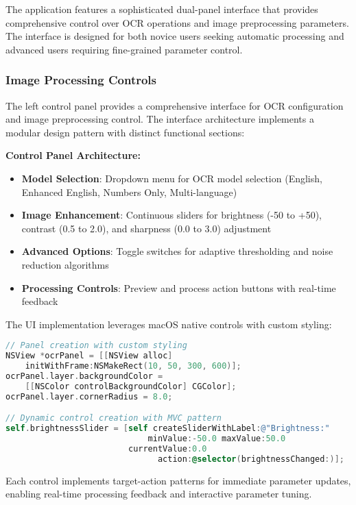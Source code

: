 The application features a sophisticated dual-panel interface that provides comprehensive control over OCR operations and image preprocessing parameters. The interface is designed for both novice users seeking automatic processing and advanced users requiring fine-grained parameter control.

\subsubsection{Image Processing Controls}

The left control panel provides a comprehensive interface for OCR configuration and image preprocessing control. The interface architecture implements a modular design pattern with distinct functional sections:

\textbf{Control Panel Architecture:}
\begin{itemize}
\item \textbf{Model Selection}: Dropdown menu for OCR model selection (English, Enhanced English, Numbers Only, Multi-language)
\item \textbf{Image Enhancement}: Continuous sliders for brightness (-50 to +50), contrast (0.5 to 2.0), and sharpness (0.0 to 3.0) adjustment
\item \textbf{Advanced Options}: Toggle switches for adaptive thresholding and noise reduction algorithms
\item \textbf{Processing Controls}: Preview and process action buttons with real-time feedback
\end{itemize}

The UI implementation leverages macOS native controls with custom styling:

\begin{lstlisting}[language=C,basicstyle=\footnotesize\ttfamily,frame=single,breaklines=true,columns=flexible]
// Panel creation with custom styling
NSView *ocrPanel = [[NSView alloc] 
    initWithFrame:NSMakeRect(10, 50, 300, 600)];
ocrPanel.layer.backgroundColor = 
    [[NSColor controlBackgroundColor] CGColor];
ocrPanel.layer.cornerRadius = 8.0;

// Dynamic control creation with MVC pattern
self.brightnessSlider = [self createSliderWithLabel:@"Brightness:" 
                             minValue:-50.0 maxValue:50.0 
                         currentValue:0.0 
                               action:@selector(brightnessChanged:)];
\end{lstlisting}

Each control implements target-action patterns for immediate parameter updates, enabling real-time processing feedback and interactive parameter tuning.

